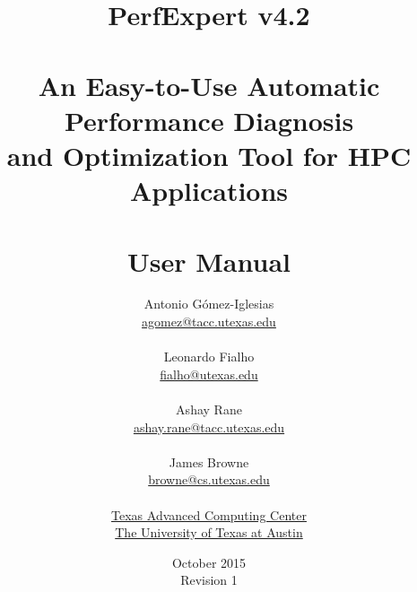 \documentclass[titlepage]{report}
\begin{document}
\title{{\Huge PerfExpert v4.2}\\ \ \\
	An Easy-to-Use Automatic Performance Diagnosis\\and Optimization Tool for HPC Applications\\ \ \\
    {\Huge User Manual}
}
\author{Antonio G\'{o}mez-Iglesias\\
	\href{mailto:agomez@tacc.utexas.edu}{agomez@tacc.utexas.edu}\\ \ \\
	Leonardo Fialho\\
        \href{mailto:fialho@utexas.edu}{fialho@utexas.edu}\\ \ \\
	Ashay Rane\\
	\href{mailto:ashay.rane@tacc.utexas.edu}{ashay.rane@tacc.utexas.edu}\\ \ \\
	James Browne\\
	\href{mailto:browne@cs.utexas.edu}{browne@cs.utexas.edu}\\ \ \\
	\href{http://www.tacc.utexas.edu}{Texas Advanced Computing Center}\\
	\href{http://www.utexas.edu}{The University of Texas at Austin}}
\date{October 2015\\
	Revision 1}
\maketitle

\tableofcontents






\end{document}
